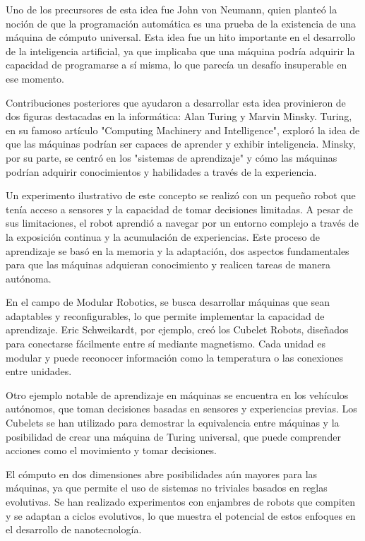 \documentclass[12pt]{article} %
\begin{document}
	Uno de los precursores de esta idea fue John von Neumann, quien planteó la noción de que la programación automática es una prueba de la existencia de una máquina de cómputo universal. Esta idea fue un hito importante en el desarrollo de la inteligencia artificial, ya que implicaba que una máquina podría adquirir la capacidad de programarse a sí misma, lo que parecía un desafío insuperable en ese momento.
	
	Contribuciones posteriores que ayudaron a desarrollar esta idea provinieron de dos figuras destacadas en la informática: Alan Turing y Marvin Minsky. Turing, en su famoso artículo "Computing Machinery and Intelligence", exploró la idea de que las máquinas podrían ser capaces de aprender y exhibir inteligencia. Minsky, por su parte, se centró en los "sistemas de aprendizaje" y cómo las máquinas podrían adquirir conocimientos y habilidades a través de la experiencia.
	
	Un experimento ilustrativo de este concepto se realizó con un pequeño robot que tenía acceso a sensores y la capacidad de tomar decisiones limitadas. A pesar de sus limitaciones, el robot aprendió a navegar por un entorno complejo a través de la exposición continua y la acumulación de experiencias. Este proceso de aprendizaje se basó en la memoria y la adaptación, dos aspectos fundamentales para que las máquinas adquieran conocimiento y realicen tareas de manera autónoma.
	
	En el campo de Modular Robotics, se busca desarrollar máquinas que sean adaptables y reconfigurables, lo que permite implementar la capacidad de aprendizaje. Eric Schweikardt, por ejemplo, creó los Cubelet Robots, diseñados para conectarse fácilmente entre sí mediante magnetismo. Cada unidad es modular y puede reconocer información como la temperatura o las conexiones entre unidades.
	
	Otro ejemplo notable de aprendizaje en máquinas se encuentra en los vehículos autónomos, que toman decisiones basadas en sensores y experiencias previas. Los Cubelets se han utilizado para demostrar la equivalencia entre máquinas y la posibilidad de crear una máquina de Turing universal, que puede comprender acciones como el movimiento y tomar decisiones.
	
	El cómputo en dos dimensiones abre posibilidades aún mayores para las máquinas, ya que permite el uso de sistemas no triviales basados en reglas evolutivas. Se han realizado experimentos con enjambres de robots que compiten y se adaptan a ciclos evolutivos, lo que muestra el potencial de estos enfoques en el desarrollo de nanotecnología.
	
\end{document}
